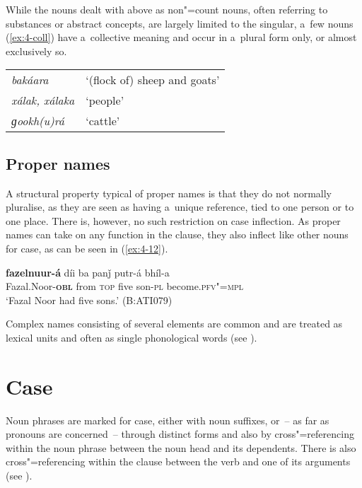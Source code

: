 While the nouns dealt with above as non"=count nouns, often referring to substances or abstract concepts, are largely limited to the singular, a~few nouns (\ref{ex:4-coll}) have a~collective meaning and occur in a~plural form only, or almost exclusively so.


\begin{exe}
\extab
\label{ex:4-coll}
\begin{tabularx}{\textwidth}{ l@{\hspace{40pt}} Q }
\textit{bakáara} &
`(flock of) sheep and goats'\\
\textit{xálak, xálaka} &
`people'\\
\textit{ɡookh(u)rá} &
`cattle'\\
\end{tabularx}
\end{exe}

\subsection{Proper names}
\label{subsec:4-4-3}

A structural property typical of proper names is that they do not normally pluralise, as they are seen as having a~unique reference, tied to one person or to one place. There is, however, no such restriction on case inflection. As proper names can take on any function in the clause, they also inflect like other nouns for case, as can be seen in (\ref{ex:4-12}).

\begin{exe}
\ex
\label{ex:4-12}
\gll \textbf{fazelnuur-á} díi ba panǰ putr-á bhíl-a \\
	Fazal.Noor-\textbf{\textsc{obl}} from \textsc{top} five son-\textsc{pl} become.\textsc{pfv"=mpl} \\
\glt `Fazal Noor had five sons.' (B:ATI079)
\end{exe}

Complex names consisting of several elements are common and are treated as lexical units and often as single phonological words (see ).

\section{Case}
\label{sec:4-5}

Noun phrases are marked for case, either with noun suffixes, or~-- as far as pronouns are concerned~-- through distinct forms and also by cross"=referencing within the noun phrase between the noun head and its dependents. There is also cross"=referencing within the clause between the verb and one of its arguments (see ).


